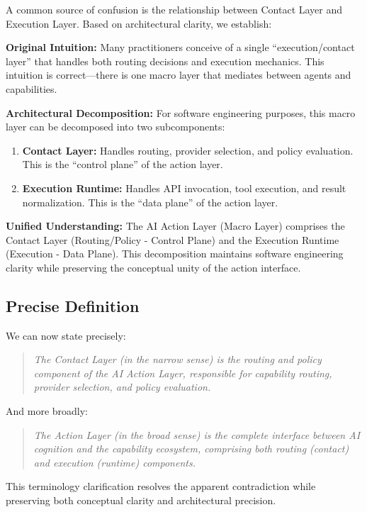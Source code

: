 A common source of confusion is the relationship between Contact Layer and Execution Layer. Based on architectural clarity, we establish:

\textbf{Original Intuition:} Many practitioners conceive of a single ``execution/contact layer'' that handles both routing decisions and execution mechanics. This intuition is correct---there is one macro layer that mediates between agents and capabilities.

\textbf{Architectural Decomposition:} For software engineering purposes, this macro layer can be decomposed into two subcomponents:
\begin{enumerate}[label=\arabic*.]
\item \textbf{Contact Layer:} Handles routing, provider selection, and policy evaluation. This is the ``control plane'' of the action layer.
\item \textbf{Execution Runtime:} Handles API invocation, tool execution, and result normalization. This is the ``data plane'' of the action layer.
\end{enumerate}

\textbf{Unified Understanding:} The AI Action Layer (Macro Layer) comprises the Contact Layer (Routing/Policy - Control Plane) and the Execution Runtime (Execution - Data Plane). This decomposition maintains software engineering clarity while preserving the conceptual unity of the action interface.

\subsection{Precise Definition}

We can now state precisely:

\begin{quote}
\textit{The Contact Layer (in the narrow sense) is the routing and policy component of the AI Action Layer, responsible for capability routing, provider selection, and policy evaluation.}
\end{quote}

And more broadly:

\begin{quote}
\textit{The Action Layer (in the broad sense) is the complete interface between AI cognition and the capability ecosystem, comprising both routing (contact) and execution (runtime) components.}
\end{quote}

This terminology clarification resolves the apparent contradiction while preserving both conceptual clarity and architectural precision.
